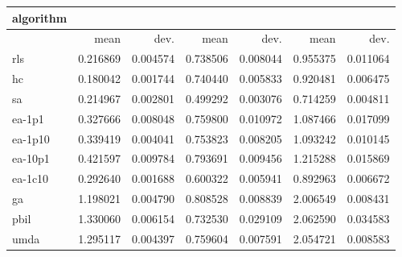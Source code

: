 \begin{tabular}{@{}l*{6}{>{{}}N{1}{2}}@{}}
\toprule
{algorithm} &  &  &  \\
\midrule
& {mean} & {dev.} & {mean} & {dev.} & {mean} & {dev.} \\
\midrule
rls & 0.216869 & 0.004574 & 0.738506 & 0.008044 & 0.955375 & 0.011064 \\
 hc & 0.180042 & 0.001744 & 0.740440 & 0.005833 & 0.920481 & 0.006475 \\
 sa & 0.214967 & 0.002801 & 0.499292 & 0.003076 & 0.714259 & 0.004811 \\
 ea-1p1 & 0.327666 & 0.008048 & 0.759800 & 0.010972 & 1.087466 & 0.017099 \\
 ea-1p10 & 0.339419 & 0.004041 & 0.753823 & 0.008205 & 1.093242 & 0.010145 \\
 ea-10p1 & 0.421597 & 0.009784 & 0.793691 & 0.009456 & 1.215288 & 0.015869 \\
 ea-1c10 & 0.292640 & 0.001688 & 0.600322 & 0.005941 & 0.892963 & 0.006672 \\
 ga & 1.198021 & 0.004790 & 0.808528 & 0.008839 & 2.006549 & 0.008431 \\
 pbil & 1.330060 & 0.006154 & 0.732530 & 0.029109 & 2.062590 & 0.034583 \\
 umda & 1.295117 & 0.004397 & 0.759604 & 0.007591 & 2.054721 & 0.008583 \\
 \bottomrule
\end{tabular}
